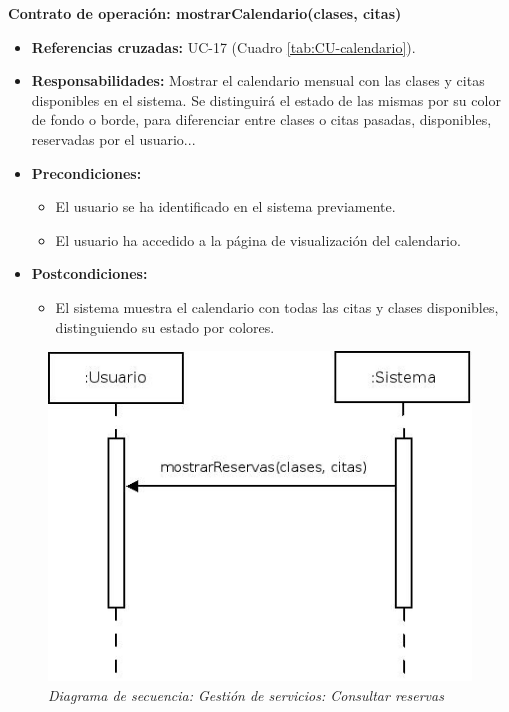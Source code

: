 \textbf{Contrato de operación: mostrarCalendario(clases, citas)}
\begin{itemize}
\item \textbf{Referencias cruzadas:} UC-17 (Cuadro \ref{tab:CU-calendario}).
\item \textbf{Responsabilidades:} Mostrar el calendario mensual con las clases y citas disponibles en el sistema. Se distinguirá el estado de las mismas por su color de fondo o borde, para diferenciar entre clases o citas pasadas, disponibles, reservadas por el usuario...
\item \textbf{Precondiciones:} 
 \begin{itemize}
\item El usuario se ha identificado en el sistema previamente.
\item El usuario ha accedido a la página de visualización del calendario.
\end {itemize}
\item \textbf{Postcondiciones:} 
 \begin{itemize}
\item El sistema muestra el calendario con todas las citas y clases disponibles, distinguiendo su estado por colores. 
\end {itemize}
\end {itemize}


\vspace{10mm}

\begin{figure}[H]
\centering
  \includegraphics[scale=.55]{img/secuencias/gestion-servicios-reservas.jpeg}
  \caption{\textit{Diagrama de secuencia: Gestión de servicios: Consultar reservas}}
  \label{fig:secuencia-gestion-servicios-reservas}
\end{figure}

